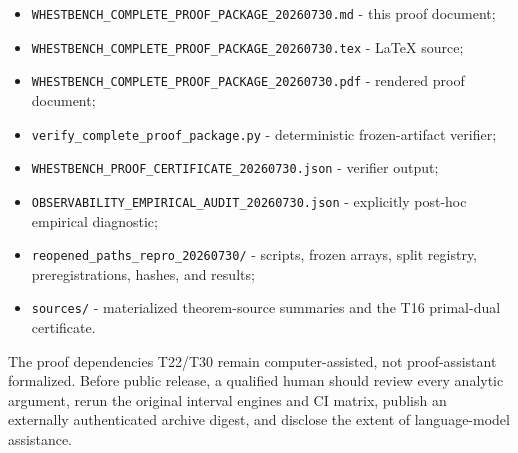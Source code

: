 \documentclass[
  10pt,
]{article}
\providecommand{\tightlist}{%
  \setlength{\itemsep}{0pt}\setlength{\parskip}{0pt}}
\begin{document}
\begin{itemize}
\tightlist
\item
  \texttt{WHESTBENCH\_COMPLETE\_PROOF\_PACKAGE\_20260730.md} - this
  proof document;
\item
  \texttt{WHESTBENCH\_COMPLETE\_PROOF\_PACKAGE\_20260730.tex} - LaTeX
  source;
\item
  \texttt{WHESTBENCH\_COMPLETE\_PROOF\_PACKAGE\_20260730.pdf} - rendered
  proof document;
\item
  \texttt{verify\_complete\_proof\_package.py} - deterministic
  frozen-artifact verifier;
\item
  \texttt{WHESTBENCH\_PROOF\_CERTIFICATE\_20260730.json} - verifier
  output;
\item
  \texttt{OBSERVABILITY\_EMPIRICAL\_AUDIT\_20260730.json} - explicitly
  post-hoc empirical diagnostic;
\item
  \texttt{reopened\_paths\_repro\_20260730/} - scripts, frozen arrays,
  split registry, preregistrations, hashes, and results;
\item
  \texttt{sources/} - materialized theorem-source summaries and the T16
  primal-dual certificate.
\end{itemize}

The proof dependencies T22/T30 remain computer-assisted, not
proof-assistant formalized. Before public release, a qualified human
should review every analytic argument, rerun the original interval
engines and CI matrix, publish an externally authenticated archive
digest, and disclose the extent of language-model assistance.
\end{document}

